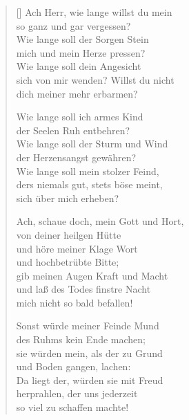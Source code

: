 \begin{multicols}{2}
\settowidth{\versewidth}{Ach Herr, wie lange willst du mein}
\begin{verse}[\versewidth]
 Ach Herr, wie lange willst du mein\\
so ganz und gar vergessen?\\
Wie lange soll der Sorgen Stein\\
mich und mein Herze pressen?\\
Wie lange soll dein Angesicht\\
sich von mir wenden? Willst du nicht\\
dich meiner mehr erbarmen?

 Wie lange soll ich armes Kind\\
der Seelen Ruh entbehren?\\
Wie lange soll der Sturm und Wind\\
der Herzensangst gewähren?\\
Wie lange soll mein stolzer Feind,\\
ders niemals gut, stets böse meint,\\
sich über mich erheben?

 Ach, schaue doch, mein Gott und Hort,\\
von deiner heilgen Hütte\\
und höre meiner Klage Wort\\
und hochbetrübte Bitte;\\
gib meinen Augen Kraft und Macht\\
und laß des Todes finstre Nacht\\
mich nicht so bald befallen!

 Sonst würde meiner Feinde Mund\\
des Ruhms kein Ende machen;\\
sie würden mein, als der zu Grund\\
und Boden gangen, lachen:\\
Da liegt der, würden sie mit Freud\\
herprahlen, der uns jederzeit\\
so viel zu schaffen machte!


\end{verse}
\end{multicols}
